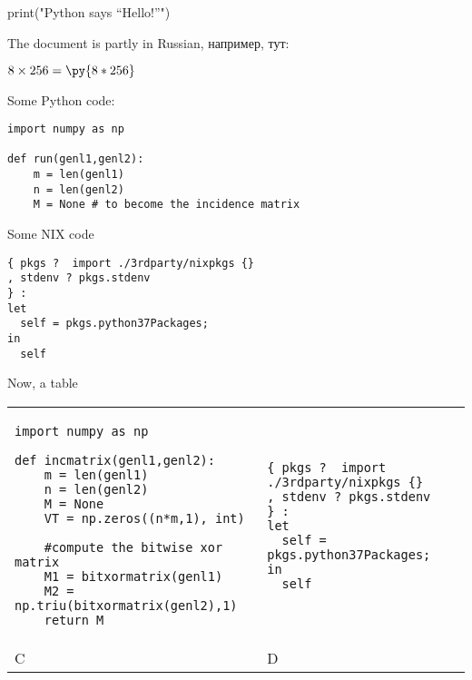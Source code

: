 \documentclass{article}
\newcommand{\pymultiply}[2]{\py{#1*#2}}
\begin{document}

\begin{pycode}
print("Python says ``Hello!''")
\end{pycode}

The document is partly in Russian, например, тут:

$8 \times 256 = \pymultiply{8}{256}$

\par
Some Python code:

\par

\begin{verbatim}
import numpy as np

def run(genl1,genl2):
    m = len(genl1)
    n = len(genl2)
    M = None # to become the incidence matrix
\end{verbatim}

\par

Some NIX code

\par

\begin{verbatim}
{ pkgs ?  import ./3rdparty/nixpkgs {}
, stdenv ? pkgs.stdenv
} :
let
  self = pkgs.python37Packages;
in
  self
\end{verbatim}

\par

Now, a table

\par

\begin{tabular}{|p{}|p{}|}
\hline

\begin{verbatim}
import numpy as np

def incmatrix(genl1,genl2):
    m = len(genl1)
    n = len(genl2)
    M = None
    VT = np.zeros((n*m,1), int)

    #compute the bitwise xor matrix
    M1 = bitxormatrix(genl1)
    M2 = np.triu(bitxormatrix(genl2),1)
    return M
\end{verbatim}

&

\begin{verbatim}
{ pkgs ?  import ./3rdparty/nixpkgs {}
, stdenv ? pkgs.stdenv
} :
let
  self = pkgs.python37Packages;
in
  self
\end{verbatim}


\\

C

&

D

\\

\hline
\end{tabular}
\end{document}
